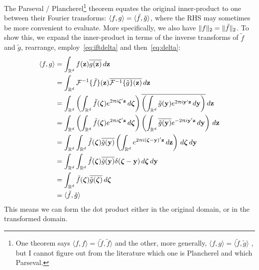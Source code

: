 \documentclass[a4paper,oneside,12pt,english]{report}
\def\zvec{\mathbf{z}}
\def\R{\mathbb{R}}
\def\yvec{\mathbf{y}}
\def\Fset{\mathcal{F}}
\def\IFT#1{\Fset^{-1}\{#1\}}
\def\conj#1{\overline{#1}}
\begin{document}
\noindent The Parseval / Plancherel\footnote{One theorem says $\langle f,f\rangle=\langle\tilde f,\tilde f\rangle$ and the other, more generally, $\langle f,g\rangle=\langle\tilde f,\tilde g\rangle$ , but I cannot figure out from the literature which one is Plancherel and which Parseval.} theorem equates the original inner-product to one between their Fourier transforms: $\langle f,g\rangle=\langle\tilde f,\tilde g\rangle$, where the RHS may sometimes be more convenient to evaluate. More specifically, we also have $\lVert f\rVert_2=\lVert\tilde f\rVert_2$. To show this, we expand the inner-product in terms of the inverse transforms of $\tilde f$ and $\tilde g$, rearrange, employ~\eqref{eq:iftdelta} and then~\eqref{eq:delta}:
\begin{align}
\begin{split}
\langle f, g \rangle &= \int_{\R^d} f(\zvec)\conj{g(\zvec)}\,d\zvec \\
&= \int_{\R^d} \IFT{\tilde f}(\zvec) \conj{\IFT{\tilde g}(\zvec)}\,d\zvec \\
&= \int_{\R^d} \left(\int_{\R^d}\tilde f(\zetavec)e^{2\uppi i \zetavec'\zvec} \,d\zetavec\right) \conj{\left(\int_{\R^d}\tilde g(\yvec)e^{2\uppi i \yvec'\zvec} \,d\yvec\right)}\,d\zvec \\
&= \int_{\R^d} \left(\int_{\R^d}\tilde f(\zetavec)e^{2\uppi i \zetavec'\zvec} \,d\zetavec\right) \left(\int_{\R^d}\conj{\tilde g(\yvec)}e^{-2\uppi i \yvec'\zvec} \,d\yvec\right)\,d\zvec \\
&= \int_{\R^d}\int_{\R^d} \tilde f(\zetavec)\conj{\tilde g(\yvec)} \left(\int_{\R^d} e^{2\uppi i(\zetavec-\yvec)'\zvec}\,d\zvec \right) \,d\zetavec\,d\yvec \\
&= \int_{\R^d}\int_{\R^d} \tilde f(\zetavec)\conj{\tilde g(\yvec)} \delta(\zetavec-\yvec) \,d\zetavec\,d\yvec \\
&= \int_{\R^d} \tilde f(\zetavec)\conj{\tilde g(\zetavec)} \,d\zetavec \\
&= \langle\tilde f, \tilde g\rangle 
\end{split}
\end{align}
This means we can form the dot product either in the original domain, or in the transformed domain.
\end{document}
